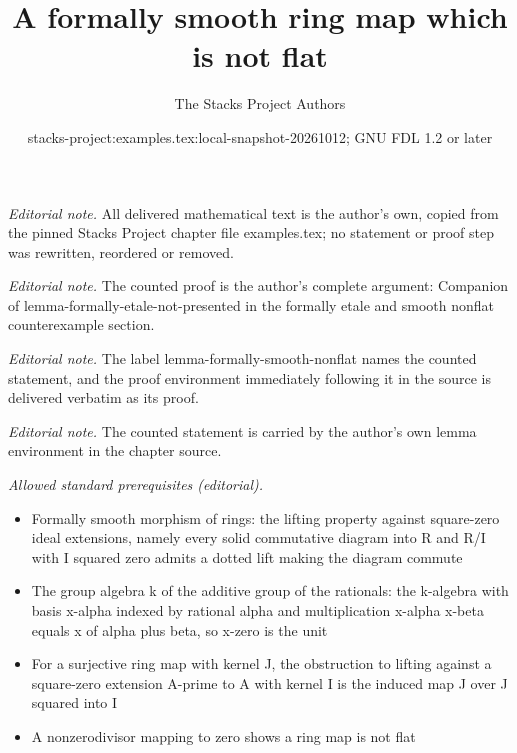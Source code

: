 \documentclass[10pt,a4paper]{amsart}
\title{A formally smooth ring map which is not flat}
\author{The Stacks Project Authors}
\date{stacks-project:examples.tex:local-snapshot-20261012; GNU FDL 1.2 or later}
\theoremstyle{plain}
\theoremstyle{definition}
\theoremstyle{remark}
\numberwithin{equation}{subsection}
\begin{document}
\maketitle
\noindent\textit{Editorial note.} All delivered mathematical text is the author's own, copied from the pinned Stacks Project chapter file examples.tex; no statement or proof step was rewritten, reordered or removed.\par\medskip
\noindent\textit{Editorial note.} The counted proof is the author's complete argument: Companion of lemma-formally-etale-not-presented in the formally etale and smooth nonflat counterexample section.\par\medskip
\noindent\textit{Editorial note.} The label lemma-formally-smooth-nonflat names the counted statement, and the proof environment immediately following it in the source is delivered verbatim as its proof.\par\medskip
\noindent\textit{Editorial note.} The counted statement is carried by the author's own lemma environment in the chapter source.\par\medskip
\noindent\textit{Allowed standard prerequisites (editorial).}\begin{itemize}
\item Formally smooth morphism of rings: the lifting property against square-zero ideal extensions, namely every solid commutative diagram into R and R/I with I squared zero admits a dotted lift making the diagram commute
\item The group algebra k of the additive group of the rationals: the k-algebra with basis x-alpha indexed by rational alpha and multiplication x-alpha x-beta equals x of alpha plus beta, so x-zero is the unit
\item For a surjective ring map with kernel J, the obstruction to lifting against a square-zero extension A-prime to A with kernel I is the induced map J over J squared into I
\item A nonzerodivisor mapping to zero shows a ring map is not flat
\end{itemize}\medskip
\label{section-formally-smooth-nonflat}
\end{document}
